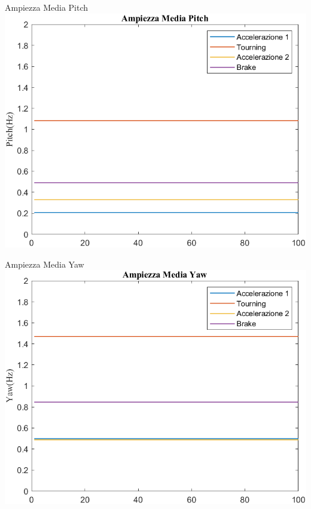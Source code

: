 \documentclass[beamer]{standalone}
\begin{document}
	\begin{frame}{{Ampiezza Media Pitch}}
		\centering\includegraphics[height=.8\textheight]{figure/VAng/Trasformata/Ampiezza MediaPitch}
	\end{frame}
	
	\begin{frame}{{Ampiezza Media Yaw}}
		\centering\includegraphics[height=.8\textheight]{figure/VAng/Trasformata/Ampiezza MediaYaw}
	\end{frame}
	
\end{document}

